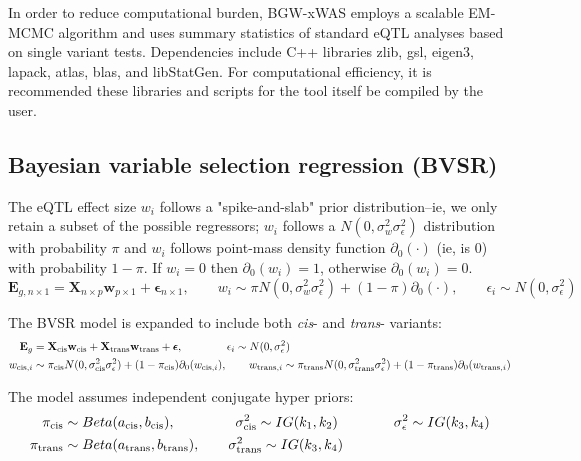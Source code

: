 \documentclass[11pt,hidelinks]{article}
\begin{document}
In order to reduce computational burden, BGW-xWAS employs a scalable EM-MCMC algorithm and uses summary statistics of standard eQTL analyses based on single variant tests. Dependencies include C++ libraries zlib, gsl, eigen3, lapack, atlas, blas, and libStatGen\cite{StatgenLibStatGen2024}. For computational efficiency, it is recommended these libraries and scripts for the tool itself be compiled by the user.

\subsection{Bayesian variable selection regression (BVSR)}
The eQTL effect size $w_i$ follows a "spike-and-slab" prior distribution–ie, we only retain a subset of the possible regressors; $w_i$ follows a $ N(0, \sigma_w^2\sigma_{\epsilon}^2)$ distribution with probability $\pi$ and $w_i$ follows point-mass density function $\partial_0(\cdot)$ (ie, is 0) with probability $1-\pi$. If $w_i=0$ then $\partial_0(w_i)=1$, otherwise $\partial_0(w_i)=0$. 
\[\textbf{E}_{g, n\times 1} = \textbf{X}_{n\times p} \textbf{w}_{p\times1} + \boldsymbol{\epsilon}_{n\times 1},\qquad w_i\sim \pi N(0, \sigma_w^2\sigma_{\epsilon}^2) + (1-\pi)\partial_0(\cdot),\qquad \epsilon_i\sim N(0,\sigma_{\epsilon}^2)\]

The BVSR model is expanded to include both \textit{cis}- and \textit{trans}- variants:
    \begin{align*}
      \textbf{E}_g &= \textbf{X}_{\textnormal{cis}}\textbf{w}_{\textnormal{cis}} +  \textbf{X}_{\textnormal{trans}}\textbf{w}_{\textnormal{trans}} + \boldsymbol{\epsilon}, \qquad\qquad  \epsilon_i\sim N(0,\sigma_{\epsilon}^2) \\
      w_{\textnormal{cis},i} &\sim \pi_{\textnormal{cis}}N(0, \sigma^2_{\textnormal{cis}}\sigma_{\epsilon}^2) + (1-\pi_{\textnormal{cis}}) \partial_0(w_{\textnormal{cis},i}), \qquad 
      w_{\textnormal{trans},i} \sim \pi_{\textnormal{trans}}N(0, \sigma^2_{\textnormal{trans}}\sigma_{\epsilon}^2) + (1-\pi_{\textnormal{trans}}) \partial_0(w_{\textnormal{trans},i})
    \end{align*}

The model assumes independent conjugate hyper priors:
    \begin{align*}
    	\pi_{\textnormal{cis}} &\sim Beta(a_{\textnormal{cis}}, b_{\textnormal{cis}}), \;\qquad\qquad \sigma^2_{\textnormal{cis}} \sim IG(k_1,k_2) \qquad\qquad \sigma^2_{\epsilon}\sim IG(k_3,k_4) \\
    	\pi_{\textnormal{trans}} &\sim Beta(a_{\textnormal{trans}}, b_{\textnormal{trans}}),\qquad \sigma^2_{\textnormal{trans}} \sim IG(k_3,k_4)
    \end{align*}
\end{document}
